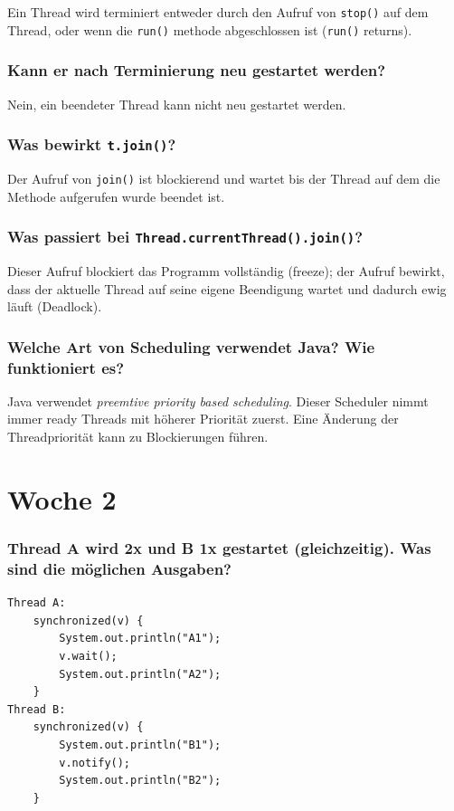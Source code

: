 \documentclass[10pt,a4paper]{scrartcl}
\begin{document}
Ein Thread wird terminiert entweder durch den Aufruf von \texttt{stop()} auf dem Thread, oder wenn
die \texttt{run()} methode abgeschlossen ist (\texttt{run()} returns).
   
\subsubsection{Kann er nach Terminierung neu gestartet werden?}

Nein, ein beendeter Thread kann nicht neu gestartet werden.
   
\subsubsection{Was bewirkt \texttt{t.join()}?}

Der Aufruf von \texttt{join()} ist blockierend und wartet bis der Thread auf dem die Methode
aufgerufen wurde beendet ist. 
   
\subsubsection{Was passiert bei \texttt{Thread.currentThread().join()}?}

Dieser Aufruf blockiert das Programm vollständig (freeze); der Aufruf bewirkt, dass der aktuelle
Thread auf seine eigene Beendigung wartet und dadurch ewig läuft (Deadlock).
   
\subsubsection{Welche Art von Scheduling verwendet Java? Wie funktioniert es? }

Java verwendet \textit{preemtive priority based scheduling}. Dieser Scheduler nimmt immer ready Threads
mit höherer Priorität zuerst. Eine Änderung der Threadpriorität kann zu Blockierungen führen.


\section{Woche 2}


\subsubsection{Thread A wird 2x und B 1x gestartet (gleichzeitig). Was sind die möglichen
Ausgaben?}

\begin{verbatim}
Thread A:
    synchronized(v) { 
        System.out.println("A1"); 
        v.wait(); 
        System.out.println("A2"); 
    }   
Thread B:
    synchronized(v) {
        System.out.println("B1");
        v.notify();
        System.out.println("B2");
    }   
\end{verbatim}
\end{document}
